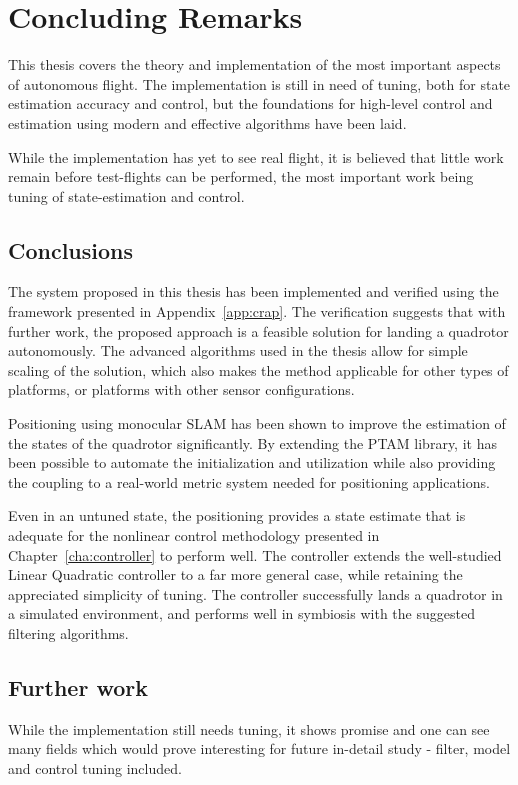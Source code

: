 \chapter{Concluding Remarks}
\label{cha:conclusions}
    This thesis covers the theory and implementation of the most
    important aspects of autonomous flight. The implementation is
    still in need of tuning, both for state estimation accuracy and control,
    but the foundations for high-level control and estimation using
    modern and effective algorithms have been laid.

    While the implementation has yet to see real flight, it is believed
    that little work remain before test-flights can be performed,
    the most important work being tuning of state-estimation and control.

\section{Conclusions}
    The system proposed in this thesis has been implemented and verified
    using the framework presented in Appendix~\ref{app:crap}.
    The verification suggests that with further work, the proposed approach
    is a feasible solution for landing a quadrotor autonomously.
    The advanced algorithms used in the thesis allow for
    simple scaling of the solution, which also makes the method applicable
    for other types of platforms, or platforms with other sensor configurations.

    Positioning using monocular SLAM has been shown to improve the estimation of the states
    of the quadrotor significantly. By extending the PTAM library,
    it has been possible to automate the initialization and utilization
    while also providing the coupling to a real-world metric system needed
    for positioning applications.

    Even in an untuned state, the positioning provides a state estimate
    that is adequate for the nonlinear control methodology presented
    in Chapter~\ref{cha:controller} to perform well.
    The controller extends the well-studied Linear Quadratic controller
    to a far more general case, while retaining the appreciated simplicity of tuning.
    The controller successfully lands a quadrotor in a simulated environment,
    and performs well in symbiosis with the suggested filtering algorithms.


\section{Further work}
\label{sec:conclusions:furtherwork}
    While the implementation still needs tuning, it shows promise
    and one can see many fields which would prove interesting for
    future in-detail study - filter, model and control tuning included.

